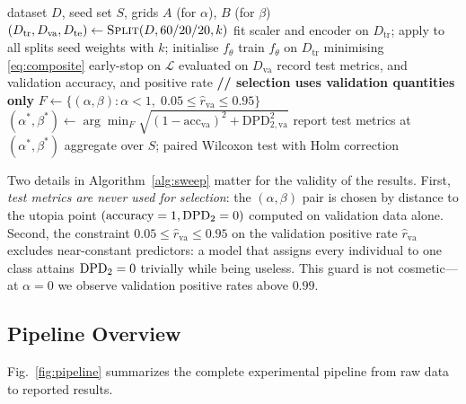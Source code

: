 \begin{algorithm}[t]
\caption{$\alpha\times\beta$ sweep with validation-only selection}
\label{alg:sweep}
\begin{algorithmic}[1]
\Require dataset $D$, seed set $S$, grids $A$ (for $\alpha$), $B$ (for $\beta$)
  \State $(D_{\text{tr}},D_{\text{va}},D_{\text{te}}) \gets \textproc{Split}(D, 60/20/20, k)$
  \State fit scaler and encoder on $D_{\text{tr}}$; apply to all splits
     \State seed weights with $k$; initialise $f_\theta$
     \State train $f_\theta$ on $D_{\text{tr}}$ minimising \eqref{eq:composite}
     \State early-stop on $\mathcal{L}$ evaluated on $D_{\text{va}}$
     \State record test metrics, and validation accuracy,
            \dpdtwo{} and positive rate
  \EndFor
  \State \textbf{// selection uses validation quantities only}
  \State $F \gets \{(\alpha,\beta) : \alpha < 1,\;
         0.05 \le \widehat{r}_{\text{va}} \le 0.95 \}$
  \State $(\alpha^\ast,\beta^\ast) \gets
         \arg\min_{F} \sqrt{(1-\mathrm{acc}_{\text{va}})^2
         + \mathrm{DPD}_{2,\text{va}}^{2}}$
  \State report test metrics at $(\alpha^\ast,\beta^\ast)$
\EndFor
\State aggregate over $S$; paired Wilcoxon test with Holm correction
\end{algorithmic}
\end{algorithm}

Two details in Algorithm~\ref{alg:sweep} matter for the validity of the
results. First, \emph{test metrics are never used for selection}: the
$(\alpha,\beta)$ pair is chosen by distance to the utopia point
$(\text{accuracy}=1, \mathrm{DPD}_{2}=0)$ computed on validation data alone. Second,
the constraint $0.05 \le \widehat{r}_{\text{va}} \le 0.95$ on the validation
positive rate $\widehat{r}_{\text{va}}$ excludes near-constant predictors: a
model that assigns every individual to one class attains
$\mathrm{DPD}_{2} = 0$ trivially while being useless. This guard is not cosmetic---at
$\alpha=0$ we observe validation positive rates above $0.99$.

\subsection{Pipeline Overview}

Fig.~\ref{fig:pipeline} summarizes the complete experimental pipeline from raw
data to reported results.

